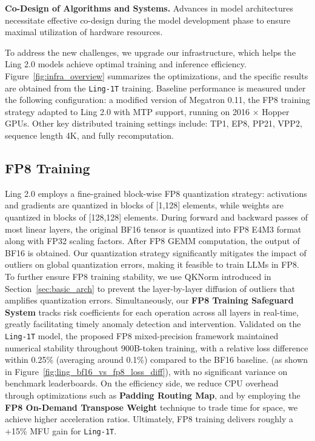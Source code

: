 \documentclass[table]{gtech}
\theoremstyle{definition}
\begin{document}
\textbf{Co-Design of Algorithms and Systems.} Advances in model architectures necessitate effective co-design during the model development phase to ensure maximal utilization of hardware resources.

To address the new challenges, we upgrade our infrastructure, which helps the Ling 2.0 models achieve optimal training and inference efficiency. 
Figure~\ref{fig:infra_overview} summarizes the optimizations, and the specific results are obtained from the \texttt{Ling-1T} training.
Baseline performance is measured under the following configuration: a modified version of Megatron 0.11, the FP8 training strategy adapted to Ling 2.0 with MTP support, running on 2016 $\times$ Hopper GPUs.
Other key distributed training settings include: TP1, EP8, PP21, VPP2, sequence length 4K, and fully recomputation.

\subsection{FP8 Training}

Ling 2.0 employs a fine-grained block-wise FP8 quantization strategy: activations and gradients are quantized in blocks of [1,128] elements, while weights are quantized in blocks of [128,128] elements. During forward and backward passes of most linear layers, the original BF16 tensor is quantized into FP8 E4M3 format along with FP32 scaling factors. 
After FP8 GEMM computation, the output of BF16 is obtained.
Our quantization strategy significantly mitigates the impact of outliers on global quantization errors, making it feasible to train LLMs in FP8. To further ensure FP8 training stability, we use QKNorm introduced in Section~\ref{sec:basic_arch} to prevent the layer-by-layer diffusion of outliers that amplifies quantization errors. 
Simultaneously, our \textbf{FP8 Training Safeguard System} tracks risk coefficients for each operation across all layers in real-time, greatly facilitating timely anomaly detection and intervention. 
Validated on the \texttt{Ling-1T} model, the proposed FP8 mixed-precision framework maintained numerical stability throughout 900B-token training, with a relative loss difference within 0.25\% (averaging around 0.1\%) compared to the BF16 baseline. (as shown in Figure~\ref{fig:ling_bf16_vs_fp8_loss_diff}), with no significant variance on benchmark leaderboards.
On the efficiency side, we reduce CPU overhead through optimizations such as \textbf{Padding Routing Map}, and by employing the \textbf{FP8 On-Demand Transpose Weight} technique to trade time for space, we achieve higher acceleration ratios. Ultimately, FP8 training delivers roughly a +15\% MFU gain for \texttt{Ling-1T}.
\end{document}
